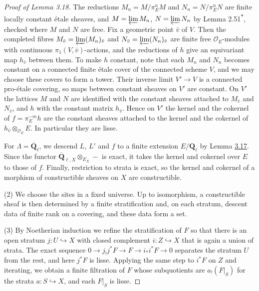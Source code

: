 \documentclass[11pt]{article}
\newcommand{\bpout}[1]{#1\textsuperscript{\hyperlink{bp-outside}{\ensuremath{\ast}}}}
\providecommand{\QbarX}{}\renewcommand{\QbarX}{\overline{\mathbf Q}_{\ell,X}}
\begin{document}
\begin{proof}[{Proof of Lemma 3.18}]
The reductions \(M_n=M/\pi_E^nM\) and \(N_n=N/\pi_E^nN\) are finite locally constant étale sheaves, and \(M=\varprojlim M_n\), \(N=\varprojlim N_n\) by Lemma \bpout{2.51}, checked where \(M\) and \(N\) are free. Fix a geometric point \(\bar v\) of \(V\). Then the completed fibres \(M_{\bar v}=\varprojlim(M_n)_{\bar v}\) and \(N_{\bar v}=\varprojlim(N_n)_{\bar v}\) are finite free \(\mathcal O_E\)-modules with continuous \(\pi_1(V,\bar v)\)-actions, and the reductions of \(h\) give an equivariant map \(h_{\bar v}\) between them. To make \(h\) constant, note that each \(M_n\) and \(N_n\) becomes constant on a connected finite étale cover of the connected scheme \(V\), and we may choose these covers to form a tower. Their inverse limit \(V'\to V\) is a connected pro-étale covering, so maps between constant sheaves on \(V'\) are constant. On \(V'\) the lattices \(M\) and \(N\) are identified with the constant sheaves attached to \(M_{\bar v}\) and \(N_{\bar v}\), and \(h\) with the constant matrix \(h_{\bar v}\). Hence on \(V'\) the kernel and the cokernel of \(f=\pi_E^{-m}h\) are the constant sheaves attached to the kernel and the cokernel of \(h_{\bar v}\otimes_{\mathcal O_E}E\). In particular they are lisse.

For \(\Lambda=\overline{\mathbf Q}_\ell\), we descend \(L\), \(L'\) and \(f\) to a finite extension \(E/\mathbf Q_\ell\) by Lemma \hyperref[bp53]{3.17}. Since the functor \(\QbarX\otimes_{E_X}-\) is exact, it takes the kernel and cokernel over \(E\) to those of \(f\). Finally, restriction to strata is exact, so the kernel and cokernel of a morphism of constructible sheaves on \(X\) are constructible.

(2) We choose the sites in a fixed universe. Up to isomorphism, a constructible sheaf is then determined by a finite stratification and, on each stratum, descent data of finite rank on a covering, and these data form a set.

(3) By Noetherian induction we refine the stratification of \(F\) so that there is an open stratum \(j:U\hookrightarrow X\) with closed complement \(i:Z\hookrightarrow X\) that is again a union of strata. The exact sequence \(0\to j_!j^*F\to F\to i_*i^*F\to0\) separates the stratum \(U\) from the rest, and here \(j^*F\) is lisse. Applying the same step to \(i^*F\) on \(Z\) and iterating, we obtain a finite filtration of \(F\) whose subquotients are \(a_!(F|_S)\) for the strata \(a:S\hookrightarrow X\), and each \(F|_S\) is lisse.
\end{proof}
\end{document}

